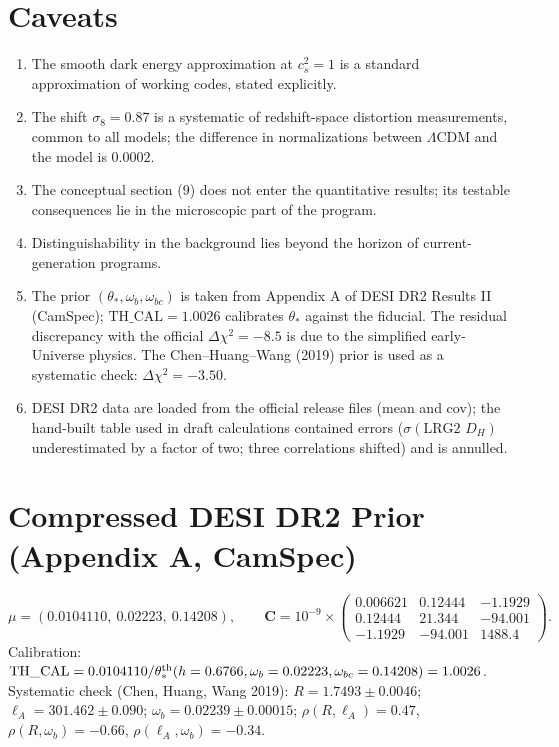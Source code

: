 \documentclass[11pt,a4paper]{article}
\begin{document}
\section{Caveats}
\begin{enumerate}
\item The smooth dark energy approximation at $c_s^2=1$ is a standard approximation of working codes, stated explicitly.
\item The shift $\sigma_8=0.87$ is a systematic of redshift-space distortion measurements, common to all models; the difference in normalizations between $\Lambda$CDM and the model is $0.0002$.
\item The conceptual section (9) does not enter the quantitative results; its testable consequences lie in the microscopic part of the program.
\item Distinguishability in the background lies beyond the horizon of current-generation programs.
\item The prior $(\theta_*,\omega_b,\omega_{bc})$ is taken from Appendix A of DESI DR2 Results II (CamSpec); $\mathrm{TH\_CAL}=1.0026$ calibrates $\theta_*$ against the fiducial. The residual discrepancy with the official $\Delta\chi^2=-8.5$ is due to the simplified early-Universe physics. The Chen--Huang--Wang (2019) prior is used as a systematic check: $\Delta\chi^2=-3.50$.
\item DESI DR2 data are loaded from the official release files (mean and cov); the hand-built table used in draft calculations contained errors ($\sigma(\text{LRG2 }D_H)$ underestimated by a factor of two; three correlations shifted) and is annulled.
\end{enumerate}

\appendix
\section{Compressed DESI DR2 Prior (Appendix A, CamSpec)}
\label{app:priors}
\[
\mu=(0.0104110,\ 0.02223,\ 0.14208),\qquad
\mathbf{C}=10^{-9}\times\begin{pmatrix}
0.006621 & 0.12444 & -1.1929\\
0.12444 & 21.344 & -94.001\\
-1.1929 & -94.001 & 1488.4
\end{pmatrix}.
\]
Calibration: $\mathrm{TH\_CAL}=0.0104110/\theta_*^{\rm th}(h=0.6766,\omega_b=0.02223,\omega_{bc}=0.14208)=1.0026$.
Systematic check (Chen, Huang, Wang 2019): $R=1.7493\pm0.0046$; $\ell_A=301.462\pm0.090$; $\omega_b=0.02239\pm0.00015$; $\rho(R,\ell_A)=0.47$, $\rho(R,\omega_b)=-0.66$, $\rho(\ell_A,\omega_b)=-0.34$.
\end{document}
